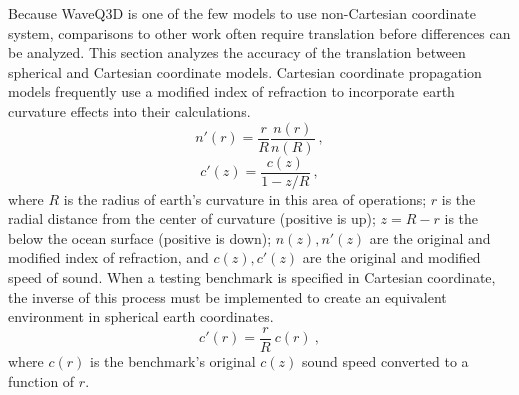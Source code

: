 \documentclass{ws-jca}
\begin{document}
Because WaveQ3D is one of the few models to use non-Cartesian coordinate
system, comparisons to other work often require translation before
differences can be analyzed. This section analyzes the accuracy of the
translation between spherical and Cartesian coordinate models. Cartesian
coordinate propagation models frequently use a modified index of
refraction\cite{Pekeris1946} to incorporate earth curvature effects into
their calculations.
\begin{equation}
	n'(r) = \frac{r}{R} \frac{n(r)}{n(R)} \:, 
\end{equation}
\begin{equation}
	c'(z) = \frac{c(z)}{1-z/R} \:, 
\end{equation}
where
$R$ is the radius of earth's curvature in this area of operations;
$r$ is the radial distance from the center of curvature (positive is up);
$z = R-r$ is the below the ocean surface (positive is down);
$n(z), n'(z)$ are the original and modified index of refraction, and
$c(z), c'(z)$ are the original and modified speed of sound.
When a testing benchmark is specified in Cartesian coordinate, the inverse of this
process must be implemented to create an equivalent environment in
spherical earth coordinates.
\begin{equation}
	c'(r) = \frac{r}{R} \: c(r) \:, 
	\label{eq:cflat_adjustment}
\end{equation}
where $c(r)$ is the benchmark's original $c(z)$ sound speed converted to a
function of $r$.
\end{document}
